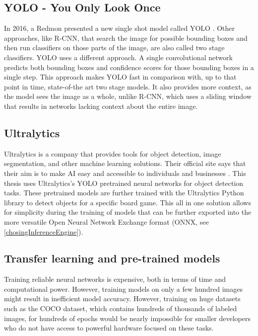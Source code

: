 \subsection{YOLO - You Only Look Once}
\label{yolo}
In 2016, a Redmon presented a new single shot model called YOLO \cite{Redmon_2016_CVPR}. Other approaches, like R-CNN, that search the image for possible bounding boxes and then run classifiers on those parts of the image, are also called two stage classifiers. YOLO uses a different approach. A single convolutional network predicts both bounding boxes and confidence scores for those bounding boxes in a single step. This approach makes YOLO fast in comparison with, up to that point in time, state-of-the art two stage models. It also provides more context, as the model sees the image as a whole, unlike R-CNN, which uses a sliding window that results in networks lacking context about the entire image.

\subsection{Ultralytics}
\label{Ultralytics}
Ultralytics is a company that provides tools for object detection, image segmentation, and other machine learning solutions. Their official site says that their aim is to make AI easy and accessible to individuals and businesses \cite{ultralyticsAbout}. This thesis uses Ultralytics's YOLO pretrained neural networks for object detection tasks. These pretrained models are further trained with the Ultralytics Python library to detect objects for a specific board game. This all in one solution allows for simplicity during the training of models that can be further exported into the more versatile Open Neural Network Exchange format (ONNX, see \ref{chosingInferenceEngine}).


\subsection{Transfer learning and pre-trained models}   
\label{pretrainedModels}
Training reliable neural networks is expensive, both in terms of time and computational power. However, training models on only a few hundred images might result in inefficient model accuracy. However, training on huge datasets such as the COCO dataset, which contains hundreds of thousands of labeled images, for hundreds of epochs would be nearly impossible for smaller developers who do not have access to powerful hardware focused on these tasks.

